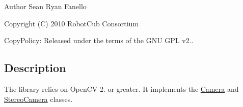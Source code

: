 \begin{DoxyAuthor}{Author}
Sean Ryan Fanello
\end{DoxyAuthor}
Copyright (C) 2010 Robot\+Cub Consortium

Copy\+Policy\+: Released under the terms of the G\+N\+U G\+P\+L v2..\hypertarget{group__SFM_intro_sec}{}\subsection{Description}\label{group__SFM_intro_sec}
The library relies on Open\+C\+V 2. or greater. It implements the \hyperlink{classCamera}{Camera} and \hyperlink{classStereoCamera}{Stereo\+Camera} classes. 